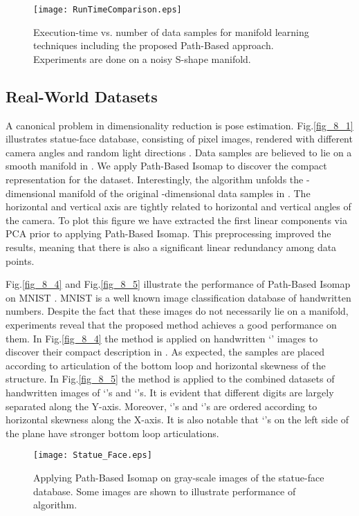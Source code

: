 \documentclass[10pt,journal,cspaper,compsoc]{IEEEtran}
\let\MYoriglatexcaption\caption
\renewcommand{\caption}[2][\relax]{\MYoriglatexcaption[#2]{#2}}
\begin{document}
\begin{figure}[t]
\centering
	\texttt{[image: RunTimeComparison.eps]}
	\caption{{\small Execution-time vs. number of data samples for  manifold learning techniques including the proposed Path-Based approach. Experiments are done on a noisy S-shape manifold.}}
	\label{fig_runTime_comp}
\end{figure}

\subsection{Real-World Datasets}
A canonical problem in dimensionality reduction is pose estimation. Fig.\ref{fig_8_1} illustrates statue-face database, consisting of   pixel images, rendered with different camera angles and random light directions \cite{statueFace}.  
Data samples are believed to lie on a smooth manifold in  \cite{tenenbaum2000global}. We apply Path-Based Isomap to discover the compact representation for the dataset. Interestingly, the algorithm unfolds the -dimensional manifold of the original -dimensional data samples in . The horizontal and vertical axis are tightly related to horizontal and vertical angles of the camera. 
To plot this figure we have extracted the first  linear components via PCA prior to applying Path-Based Isomap. This preprocessing improved the results, meaning that there is also a significant linear redundancy among data points. 

Fig.\ref{fig_8_4} and Fig.\ref{fig_8_5} illustrate the performance of Path-Based Isomap on MNIST \cite{MNIST}. MNIST is a well known image classification database of handwritten numbers. Despite the fact that these images do not necessarily lie on a manifold, experiments reveal that the proposed method achieves a good performance on them. In Fig.\ref{fig_8_4} the method is applied on handwritten `' images to discover their compact description in . As expected, the samples are placed according to articulation of the bottom loop and horizontal skewness of the structure. In Fig.\ref{fig_8_5} the method is applied to the combined datasets of handwritten images of `'s and `'s. It is evident that different digits are largely separated along the Y-axis. Moreover, `'s and `'s are ordered according to horizontal skewness along the X-axis. It is also notable that `'s on the left side of the plane have stronger bottom loop articulations.

\begin{figure}[t]
\centering
    \texttt{[image: Statue\_Face.eps]}
    \caption{{\small Applying Path-Based Isomap on  gray-scale images of the statue-face database. Some images are shown to illustrate performance of algorithm.}}
    \label{fig_8_3}
\end{figure}
\end{document}
